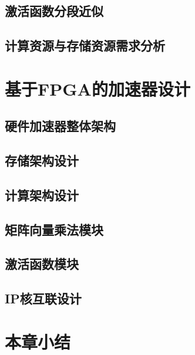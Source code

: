 \subsection{激活函数分段近似}
\subsection{计算资源与存储资源需求分析}

\section{基于FPGA的加速器设计}
\subsection{硬件加速器整体架构}

\subsection{存储架构设计}

\subsection{计算架构设计}

\subsection{矩阵向量乘法模块}

\subsection{激活函数模块}

\subsection{IP核互联设计}

\section{本章小结}
